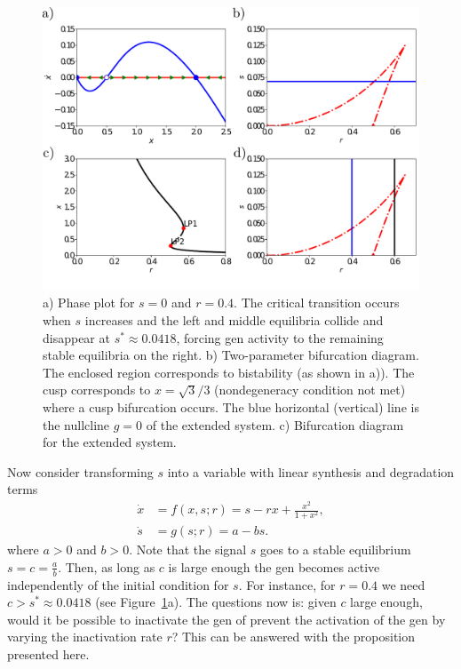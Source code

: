 \documentclass[12pt]{article}
\begin{document}
\begin{figure}
    \begin{center}
    \includegraphics[width=0.98\linewidth]{figures/ApplicationGen.pdf}
    \end{center}
    \caption{a) Phase plot for $s=0$ and $r=0.4$. The critical transition occurs when $s$ increases and the left and middle equilibria collide and disappear at $s^*\approx 0.0418$, forcing gen activity to the remaining stable equilibria on the right. b) Two-parameter bifurcation diagram. The enclosed region corresponds to bistability (as shown in a)). The cusp corresponds to $x=\sqrt{3}/3$ (nondegeneracy condition not met) where a cusp bifurcation occurs. The blue horizontal (vertical) line is the nullcline $g=0$ of the extended system. c) Bifurcation diagram for the extended system.}
    \label{fig:Application:GenActivation}
\end{figure}

Now consider transforming $s$ into a variable with linear synthesis and degradation terms
\begin{equation}
    \begin{aligned}
        \dot x & = f(x,s;r) = s - rx + \frac{x^{2}}{1+x^{2}}, \\
        \dot s & = g(s;r) = a - bs.
    \end{aligned}
    \label{equ:Application:GenActivation2:2D}
\end{equation}
where $a>0$ and $b>0$. Note that the signal $s$ goes to a stable equilibrium $s=c=\frac{a}{b}$. Then, as long as $c$ is large enough the gen becomes active independently of the initial condition for $s$. For instance, for $r=0.4$ we need $c>s^*\approx0.0418$ (see Figure~\ref{fig:Application:GenActivation}a). The questions now is: given $c$ large enough, would it be possible to inactivate the gen of prevent the activation of the gen by varying the inactivation rate $r$? This can be answered with the proposition presented here.
\end{document}
